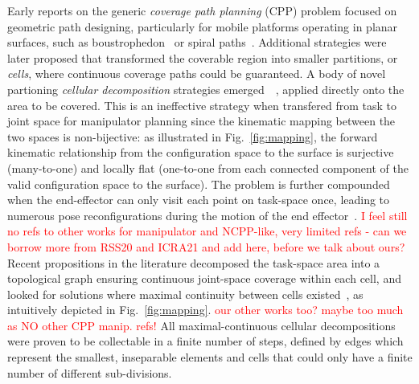 \documentclass[conference]{IEEEtran}
\begin{document}
Early reports on the generic \textit{coverage path planning} (CPP) problem focused on geometric path designing, particularly for mobile platforms operating in planar surfaces, such as boustrophedon~\cite{} or spiral paths~\cite{}. 
Additional strategies were later proposed that transformed the coverable region into smaller partitions, or \textit{cells}, where continuous coverage paths could be guaranteed. A body of novel partioning \textit{cellular decomposition} strategies emerged~\cite{}~\cite{}, applied directly onto the area to be covered. This is an ineffective strategy when transfered from task to joint space for manipulator planning since the kinematic mapping between the two spaces is non-bijective: as illustrated in Fig.~\ref{fig:mapping}, the forward kinematic relationship from the configuration space to the surface is surjective (many-to-one) and locally flat (one-to-one from each connected component of the valid configuration space to the surface). 
The problem is further compounded when the end-effector can only visit each point on task-space once, leading to numerous pose reconfigurations during the motion of the end effector~\cite{}.
\textcolor{red}{I feel still no refs to other works for manipulator and NCPP-like, very limited refs - can we borrow more from RSS20 and ICRA21 and add here, before we talk about ours?}
Recent propositions in the literature decomposed the task-space area into a %
topological graph ensuring continuous joint-space coverage within each cell, and looked for solutions where maximal continuity between cells existed~\cite{Yang2020Cellular}, as intuitively depicted in Fig.~\ref{fig:mapping}. \textcolor{red}{our other works too? maybe too much as NO other CPP manip. refs!} All maximal-continuous cellular decompositions were proven to be collectable in a finite number of steps, defined by edges which represent the smallest, inseparable elements and cells that could only have a finite number of different sub-divisions.  
\end{document}
